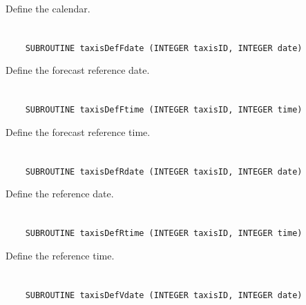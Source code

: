 Define the calendar.


\section*{\tt {}}

\begin{verbatim}
    SUBROUTINE taxisDefFdate (INTEGER taxisID, INTEGER date)
\end{verbatim}

Define the forecast reference date.


\section*{\tt {}}

\begin{verbatim}
    SUBROUTINE taxisDefFtime (INTEGER taxisID, INTEGER time)
\end{verbatim}

Define the forecast reference time.


\section*{\tt {}}

\begin{verbatim}
    SUBROUTINE taxisDefRdate (INTEGER taxisID, INTEGER date)
\end{verbatim}

Define the reference date.


\section*{\tt {}}

\begin{verbatim}
    SUBROUTINE taxisDefRtime (INTEGER taxisID, INTEGER time)
\end{verbatim}

Define the reference time.


\section*{\tt {}}

\begin{verbatim}
    SUBROUTINE taxisDefVdate (INTEGER taxisID, INTEGER date)
\end{verbatim}

